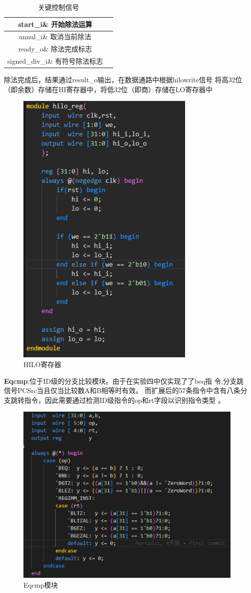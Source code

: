 \begin{table}[h]
\centering
\begin{tabular}{|c|c|} \hline 
	start\_i\& 开始除法运算\\ \hline 
	annul\_i\& 取消当前除法\\ \hline 
	ready\_o\& 除法完成标志\\ \hline 
	signed\_div\_i\& 有符号除法标志\\ \hline
\end{tabular}
\caption{关键控制信号}
\label{关键控制信号}
\end{table}

除法完成后，结果通过result\_o输出，在数据通路中根据hilowrite信号 将高32位（即余数）存储在HI寄存器中，将低32位（即商）存储在LO寄存器中

\begin{figure}[h]
\centering
\includegraphics[width=0.25\linewidth]{image/p3.png}
\caption{HILO寄存器}
\label{fig:enter-label}
\end{figure}

\textbf{Eqcmp}:位于ID级的分支比较模块。由于在实验四中仅实现了了beq指 令,分支跳信号PCSrc当且仅当比较数A和B相等时有效。 而扩展后的57条指令中含有八条分支跳转指令，因此需要通过检测ID级指令的op和rt字段以识别指令类型 。

\begin{figure}[h]
\centering
\includegraphics[width=0.25\linewidth]{image/p4.png}
\caption{Eqcmp模块}
\label{fig:enter-label}
\end{figure}

